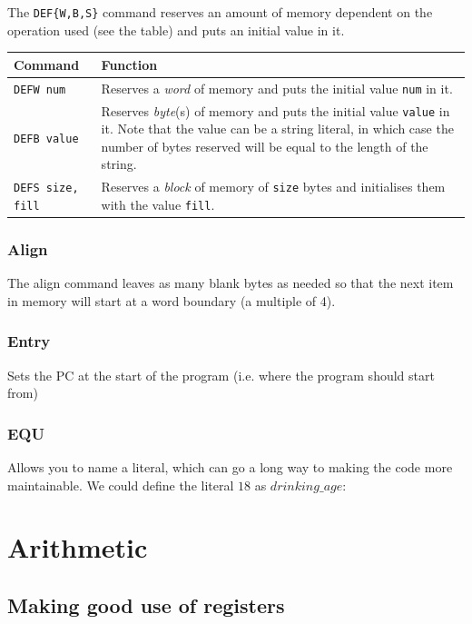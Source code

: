 The {\tt DEF\{W,B,S\}} command reserves an amount of memory dependent on the operation used (see the table) and puts an initial value in it.

\begin{tabularx}{\textwidth}{l|X}
	{\bf Command} & {\bf Function}\\ \hline
	{\tt DEFW num} & Reserves a {\it word} of memory and puts the initial value {\tt num} in it.\\ \hline
	{\tt DEFB value} & Reserves {\it byte}(s) of memory and puts the initial value {\tt value} in it. Note that the value can be a string literal, in which case the number of bytes reserved will be equal to the length of the string.\\ \hline
	{\tt DEFS size, fill} & Reserves a {\it block} of memory of {\tt size} bytes and initialises them with the value {\tt fill}. \\ \hline	
\end{tabularx}

\subsubsection{Align}
\label{subsubsec:align}
The align command leaves as many blank bytes as needed so that the next item in memory will start at a word boundary (a multiple of 4).

\subsubsection{Entry}
Sets the PC at the start of the program (i.e. where the program should start from)

\subsubsection{EQU}
Allows you to name a literal, which can go a long way to making the code more maintainable. We could define the literal $18$ as $drinking\_age$:


\section{Arithmetic}

\subsection{Making good use of registers}


